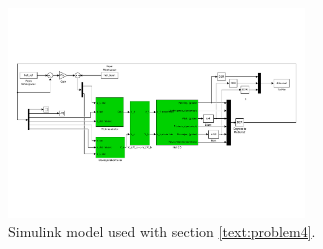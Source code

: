 \begin{figure}[h]
	\centering
		\includegraphics[width = 0.70\textwidth]{figures/4/simulink.pdf}
	\caption{Simulink model used with section \ref{text:problem4}.}
\end{figure}
